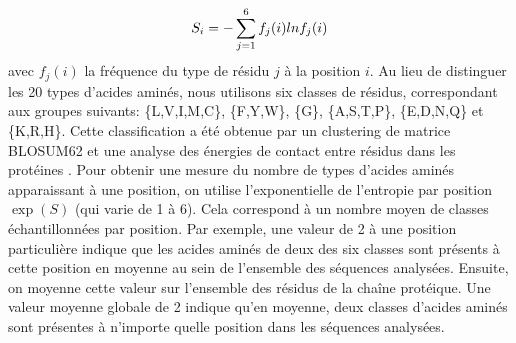 \begin{equation} \label{eq:entropy}
  S_i = - \sum_{j=1}^6 f_j(i)lnf_j(i) \\
\end{equation} 
avec $f_j(i)$ la fréquence du type de résidu $j$ à la position $i$. Au lieu de distinguer les 20 types d'acides aminés, nous utilisons six classes de résidus, correspondant aux groupes suivants: \{L,V,I,M,C\}, \{F,Y,W\}, \{G\}, \{A,S,T,P\}, \{E,D,N,Q\} et \{K,R,H\}. Cette classification a été obtenue par un clustering de matrice BLOSUM62 et une analyse  des énergies de contact entre résidus dans les protéines \cite{Launay07}. Pour obtenir une mesure du nombre de types d'acides aminés apparaissant à une position, on utilise l'exponentielle de l'entropie par position $\exp(S)$ (qui varie de 1 à 6).  Cela correspond à un nombre moyen de classes échantillonnées par position. Par exemple, une valeur de 2 à une position particulière indique que les acides aminés de deux des six classes sont présents à cette position en moyenne au sein de l'ensemble des séquences analysées. Ensuite, on moyenne cette valeur sur l'ensemble des résidus de la chaîne protéique. Une valeur moyenne globale de 2 indique qu'en moyenne, deux classes d'acides aminés sont présentes à n'importe quelle position dans les séquences analysées.


\clearpage


